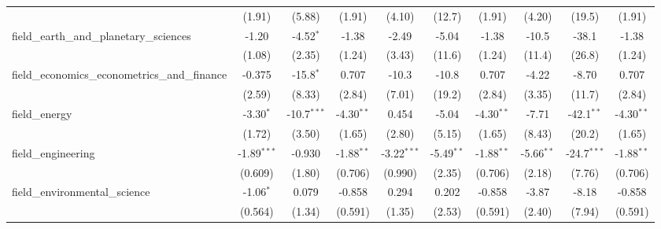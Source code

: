 \begin{tabular}{lccccccccc}
                                                               & (1.91)        & (5.88)        & (1.91)        & (4.10)         & (12.7)       & (1.91)        & (4.20)        & (19.5)         & (1.91)\\   
   field\_earth\_and\_planetary\_sciences                      & -1.20         & -4.52$^{*}$   & -1.38         & -2.49          & -5.04        & -1.38         & -10.5         & -38.1          & -1.38\\   
                                                               & (1.08)        & (2.35)        & (1.24)        & (3.43)         & (11.6)       & (1.24)        & (11.4)        & (26.8)         & (1.24)\\   
   field\_economics\_econometrics\_and\_finance                & -0.375        & -15.8$^{*}$   & 0.707         & -10.3          & -10.8        & 0.707         & -4.22         & -8.70          & 0.707\\   
                                                               & (2.59)        & (8.33)        & (2.84)        & (7.01)         & (19.2)       & (2.84)        & (3.35)        & (11.7)         & (2.84)\\   
   field\_energy                                               & -3.30$^{*}$   & -10.7$^{***}$ & -4.30$^{**}$  & 0.454          & -5.04        & -4.30$^{**}$  & -7.71         & -42.1$^{**}$   & -4.30$^{**}$\\   
                                                               & (1.72)        & (3.50)        & (1.65)        & (2.80)         & (5.15)       & (1.65)        & (8.43)        & (20.2)         & (1.65)\\   
   field\_engineering                                          & -1.89$^{***}$ & -0.930        & -1.88$^{**}$  & -3.22$^{***}$  & -5.49$^{**}$ & -1.88$^{**}$  & -5.66$^{**}$  & -24.7$^{***}$  & -1.88$^{**}$\\   
                                                               & (0.609)       & (1.80)        & (0.706)       & (0.990)        & (2.35)       & (0.706)       & (2.18)        & (7.76)         & (0.706)\\   
   field\_environmental\_science                               & -1.06$^{*}$   & 0.079         & -0.858        & 0.294          & 0.202        & -0.858        & -3.87         & -8.18          & -0.858\\   
                                                               & (0.564)       & (1.34)        & (0.591)       & (1.35)         & (2.53)       & (0.591)       & (2.40)        & (7.94)         & (0.591)\\   

\end{tabular}
